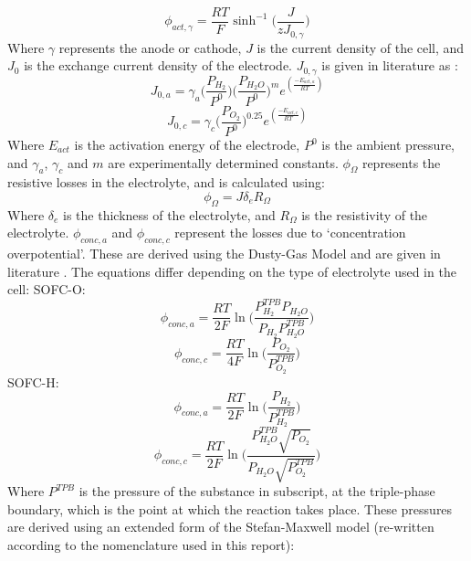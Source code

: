 \begin{equation}
\phi_{act,\gamma}=  \frac{RT}{F}   \sinh^{-1} \Big (⁡\frac{J}{zJ_{0,\gamma}} \Big )
\end{equation}
Where $\gamma$ represents the anode or cathode, $J$ is the current density of the cell, and $J_{0}$ is the exchange current density of the electrode. $J_{0,\gamma}$ is given in literature as \cite{LM4}:
\begin{equation}
J_{0,a}= \gamma_{a} \Big (\frac{P_{H_{2}}}{P^{0}}\Big ) \Big (\frac{P_{H_{2}O}}{P^{0}} \Big )^{m} e^{ (\frac{-E_{act,a}}{RT}  )}			
\end{equation}
\begin{equation}
J_{0,c}= \gamma_{c} \Big (\frac{P_{O_{2}}}{P^{0}} \Big )^{0.25} e^{(\frac{-E_{act,c}}{RT})} 					
\end{equation}
Where $E_{act}$ is the activation energy of the electrode, $P^0$ is the ambient pressure, and $\gamma_a$, $\gamma_c$ and $m$ are experimentally determined constants.
$\phi_\Omega$ represents the resistive losses in the electrolyte, and is calculated using:
\begin{equation}
\phi_{\Omega}=J\delta_{e} R_{\Omega} 						
\end{equation}
Where $\delta_e$ is the thickness of the electrolyte, and $R_\Omega$ is the resistivity of the electrolyte.
$\phi_{conc,a}$ and $\phi_{conc,c}$ represent the losses due to `concentration overpotential'. These are derived using the Dusty-Gas Model and are given in literature \cite{LM5}. The equations differ depending on the type of electrolyte used in the cell:
\newline
SOFC-O:	
\begin{equation}
\phi_{conc,a} = \frac{RT}{2F} \ln \Big (\frac{P_{H_{2}}^{TPB} P_{H_{2}O}}{P_{H_{2}} P_{H_{2}O}^{TPB}} \Big )
\end{equation}
\begin{equation}
\phi_{conc,c} = \frac{RT}{4F} \ln \Big (\frac{P_{O_{2}}}{P_{O_{2}}^{TPB}} \Big ) 			
\end{equation}
SOFC-H:	
\begin{equation}
\phi_{conc,a}=  \frac{RT}{2F} \ln \Big (\frac{ P_{H_{2}} }{ P_{H_{2}}^{TPB} } \Big )			
\end{equation}
\begin{equation}
\phi_{conc,c}=  \frac{RT}{2F} \ln \Big ( \frac{P_{H_{2}O}^{TPB} \sqrt{{P_{O_{2}}}}}{P_{H_{2}O} \sqrt{P_{O_{2}}^{TPB}}} \Big) 
\end{equation}
Where $P^{TPB}$ is the pressure of the substance in subscript, at the triple-phase boundary, which is the point at which the reaction takes place. These pressures are derived using an extended form of the Stefan-Maxwell model \cite{LM6} (re-written according to the nomenclature used in this report):
